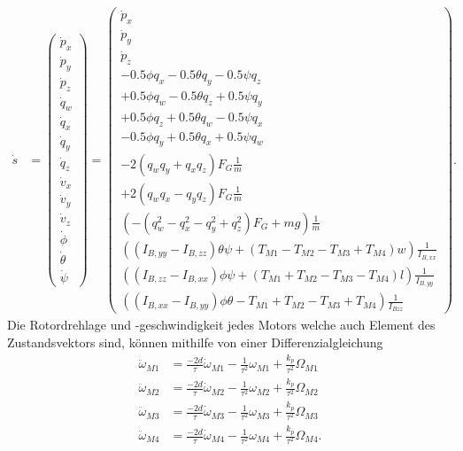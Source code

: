 \begin{align}\label{zustandsvektor:zustandsvektor}
	\dot{s} &= 
	\begin{pmatrix}
		\dot{p}_x\\
		\dot{p}_y\\
		\dot{p}_z\\
		\dot{q}_w\\
		\dot{q}_x\\
		\dot{q}_y\\
		\dot{q}_z\\
		\dot{v}_x\\
		\dot{v}_y\\
		\dot{v}_z\\
		\dot{\phi}\\
		\dot{\theta}\\
		\dot{\psi}
	\end{pmatrix} = 
	\begin{pmatrix}
		\dot{p}_x\\
		\dot{p}_y\\
		\dot{p}_z\\
		-0.5\phi q_x - 0.5\theta q_y - 0.5\psi q_z\\
		+0.5\phi q_w - 0.5\theta q_z + 0.5\psi q_y\\
		+0.5\phi q_z + 0.5\theta q_w - 0.5\psi q_x\\
		-0.5\phi q_y + 0.5\theta q_x + 0.5\psi q_w\\
		-2(q_wq_y + q_xq_z) F_G \frac{1}{m}\\
		+2(q_wq_x - q_yq_z) F_G \frac{1}{m}\\
		(-(q_w^2-q_x^2-q_y^2+q_z^2) F_G + mg) \frac{1}{m}\\
		((I_{B,yy} - I_{B,zz}) \theta \psi + (T_{M1} - T_{M2} - T_{M3} + T_{M4}) w) \frac{1}{I_{B,xx}}\\
		((I_{B,zz} - I_{B,xx}) \phi \psi + (T_{M1} + T_{M2} - T_{M3} - T_{M4}) l) \frac{1}{I_{B,yy}}\\
		((I_{B,xx} - I_{B,yy}) \phi \theta - T_{M1} + T_{M2} - T_{M3} + T_{M4})\frac{1}{I_{Bzz}}
	\end{pmatrix}.
\end{align}
Die Rotordrehlage und -geschwindigkeit jedes Motors welche auch Element des Zustandsvektors sind, können mithilfe von einer Differenzialgleichung
\begin{align}
	\ddot{\omega}_{M1} &= \frac{-2d}{\tau}\dot{\omega}_{M1} - \frac{1}{\tau^2}\omega_{M1} + \frac{k_p}{\tau^2}\Omega_{M1}\\
	\ddot{\omega}_{M2} &= \frac{-2d}{\tau}\dot{\omega}_{M2} - \frac{1}{\tau^2}\omega_{M2} + \frac{k_p}{\tau^2}\Omega_{M2}\\
	\ddot{\omega}_{M3} &= \frac{-2d}{\tau}\dot{\omega}_{M3} - \frac{1}{\tau^2}\omega_{M3} + \frac{k_p}{\tau^2}\Omega_{M3}\\
	\ddot{\omega}_{M4} &= \frac{-2d}{\tau}\dot{\omega}_{M4} - \frac{1}{\tau^2}\omega_{M4} + \frac{k_p}{\tau^2}\Omega_{M4}.
\end{align}
